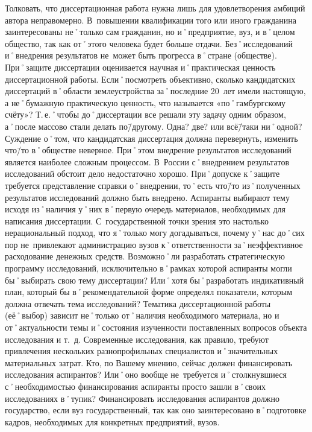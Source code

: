 \begin{drama}
	\michaelspeaks Толковать, что диссертационная работа нужна лишь для удовлетворения амбиций автора неправомерно. В~повышении квалификации того или иного гражданина заинтересованы не˚только сам гражданин, но и˚предприятие, вуз, и в˚целом общество, так как от˚этого человека будет больше отдачи. Без˚исследований и˚внедрения результатов не~может быть прогресса в˚стране (обществе). При˚защите диссертации оценивается научная и˚практическая ценность диссертационной работы.
	\maxspeaks Если˚посмотреть объективно, сколько кандидатских диссертаций в˚области землеустройства за˚последние 20~лет имели настоящую, а не˚бумажную практическую ценность, что называется  «по˚гамбургскому счёту»? Т.\,е.˚чтобы до˚диссертации все решали эту задачу одним образом, а˚после массово стали делать по\=/другому. Одна? две? или всё\=/таки ни˚одной? 
	\michaelspeaks Суждение о˚том, что кандидатская диссертация должна перевернуть, изменить что\=/то в˚обществе неверное. При˚этом внедрение результатов исследований является наиболее сложным процессом. В~России с˚внедрением результатов исследований обстоит дело недостаточно хорошо. При˚допуске к˚защите требуется представление справки о˚внедрении, то˚есть что\=/то из˚полученных результатов исследований должно быть внедрено.
	\maxspeaks Аспиранты выбирают тему исходя из˚наличия у˚них в˚первую очередь материалов, необходимых для написания диссертации. С~государственной точки зрения это настолько нерациональный подход, что я˚только могу догадываться, почему у˚нас до˚сих пор не~привлекают администрацию вузов к˚ответственности за˚неэффективное расходование денежных средств. Возможно˚ли разработать стратегическую программу исследований, исключительно в˚рамках которой аспиранты могли бы˚выбирать свою тему диссертации? Или˚хотя бы˚разработать индикативный план, который бы в˚рекомендательной форме определял показатели, которым должна отвечать тема исследований?
	\michaelspeaks Тематика диссертационной работы (её˚выбор) зависит не˚только от˚наличия необходимого материала, но и от˚актуальности темы и˚состояния изученности поставленных вопросов объекта исследования и т.~д.
	\maxspeaks Современные исследования, как правило, требуют привлечения нескольких разнопрофильных специалистов и˚значительных материальных затрат. 
	Кто, по Вашему мнению, сейчас должен финансировать исследования аспирантов? Или˚оно вообще не~требуется и˚столкнувшиеся с˚необходимостью финансирования аспиранты просто зашли в˚своих исследованиях в˚тупик?
	\michaelspeaks Финансировать исследования аспирантов должно государство, если вуз государственный, так как оно заинтересовано в˚подготовке кадров, необходимых для конкретных предприятий, вузов.

\end{drama}
